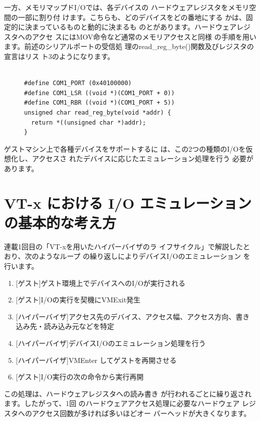 \documentclass[a4j,12pt]{jarticle}
\begin{document}
 一方、メモリマップドI/Oでは、各デバイスの
ハードウェアレジスタをメモリ空間の一部に割り付
けます。こちらも、どのデバイスをどの番地にする
かは、固定的に決まっているものと動的に決まるも
のとがあります。ハードウェアレジスタへのアクセ
スにはMOV命令など通常のメモリアクセスと同様
の手順を用います。前述のシリアルポートの受信処
理のread\_reg\_byte()関数及びレジスタの宣言はリス
ト3のようになります。

\begin{figure}

\begin{verbatim}

#define COM1_PORT (0x40100000)
#define COM1_LSR ((void *)(COM1_PORT + 0))
#define COM1_RBR ((void *)(COM1_PORT + 5))
unsigned char read_reg_byte(void *addr) {
  return *((unsigned char *)addr);
}
\end{verbatim}
\end{figure}

 ゲストマシン上で各種デバイスをサポートするに
は、この2つの種類のI/Oを仮想化し、アクセスさ
れたデバイスに応じたエミュレーション処理を行う
必要があります。


\section{VT-x における I/O エミュレーションの基本的な考え方}

 連載1回目の「VT-xを用いたハイパーバイザのラ
イフサイクル」で解説したとおり、次のようなループ
の繰り返しによりデバイスI/Oのエミュレーション
を行います。

\begin{enumerate}
\item{[ゲスト]ゲスト環境上でデバイスへのI/Oが実行される}
\item{[ゲスト]I/Oの実行を契機にVMExit発生}
\item{[ハイパーバイザ]アクセス先のデバイス、アクセス幅、アクセス方向、書き込み先・読み込み元などを特定}
\item{[ハイパーバイザ]デバイスI/Oのエミュレーション処理を行う}
\item{[ハイパーバイザ]VMEnter してゲストを再開させる}
\item{[ゲスト]I/O実行の次の命令から実行再開}
\end{enumerate}

 この処理は、ハードウェアレジスタへの読み書き
が行われるごとに繰り返されます。したがって、1回
のハードウェアアクセス処理に必要なハードウェア
レジスタへのアクセス回数が多ければ多いほどオー
バーヘッドが大きくなります。
\end{document}
